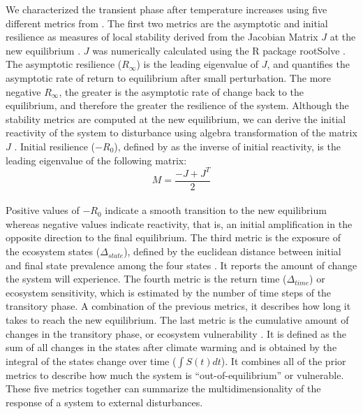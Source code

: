 We characterized the transient phase after temperature increases using
five different metrics from \citet{Boulangeat2018}. The first two
metrics are the asymptotic and initial resilience as measures of local
stability derived from the Jacobian Matrix \(J\) at the new equilibrium
\citep{Arnoldi2016}. \(J\) was numerically calculated using the R
package rootSolve \citep{Soetaert2009, Soetaert2009a}. The asymptotic
resilience (\(R_{\infty}\)) is the leading eigenvalue of \(J\), and
quantifies the asymptotic rate of return to equilibrium after small
perturbation. The more negative \(R_{\infty}\), the greater is the
asymptotic rate of change back to the equilibrium, and therefore the
greater the resilience of the system. Although the stability metrics are
computed at the new equilibrium, we can derive the initial reactivity of
the system to disturbance using algebra transformation of the matrix
\(J\) \citep{Neubert1997}. Initial resilience (\(-R_0\)), defined by
\citet{Arnoldi2016} as the inverse of initial reactivity, is the leading
eigenvalue of the following matrix:\\

\begin{equation}
M = \frac{-J + J^T}{2}
\label{eq:jacob}\end{equation}\\

Positive values of \(-R_0\) indicate a smooth transition to the new
equilibrium whereas negative values indicate reactivity, that is, an
initial amplification in the opposite direction to the final
equilibrium. The third metric is the exposure of the ecosystem states
(\(\Delta_{state}\)), defined by the euclidean distance between initial
and final state prevalence among the four states \citep{Dawson2011}. It
reports the amount of change the system will experience. The fourth
metric is the return time (\(\Delta_{time}\)) or ecosystem sensitivity,
which is estimated by the number of time steps of the transitory phase.
A combination of the previous metrics, it describes how long it takes to
reach the new equilibrium. The last metric is the cumulative amount of
changes in the transitory phase, or ecosystem vulnerability
\citep{Boulangeat2018}. It is defined as the sum of all changes in the
states after climate warming and is obtained by the integral of the
states change over time (\(\int S(t)dt\)). It combines all of the prior
metrics to describe how much the system is ``out-of-equilibrium'' or
vulnerable. These five metrics together can summarize the
multidimensionality of the response of a system to external
disturbances.\\

